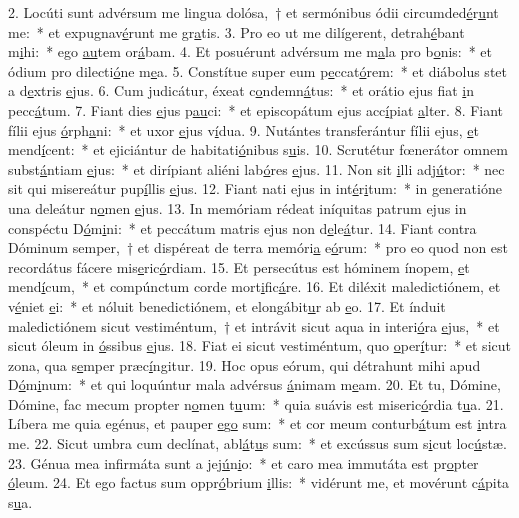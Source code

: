2. Locúti sunt advérsum me lingua dolósa,~† et sermónibus ódii circumded\uline{é}r\uline{u}nt me:~* et expugnav\uline{é}runt me gr\uline{a}tis.
3. Pro eo ut me dilígerent, detrah\uline{é}bant m\uline{i}hi:~* ego \uline{au}tem or\uline{á}bam.
4. Et posuérunt advérsum me m\uline{a}la pro b\uline{o}nis:~* et ódium pro dilecti\uline{ó}ne m\uline{e}a.
5. Constítue super eum p\uline{e}ccat\uline{ó}rem:~* et diábolus stet a d\uline{e}xtris \uline{e}jus.
6. Cum judicátur, éxeat c\uline{o}ndemn\uline{á}tus:~* et orátio ejus fiat \uline{i}n pecc\uline{á}tum.
7. Fiant dies \uline{e}jus p\uline{au}ci:~* et episcopátum ejus acc\uline{í}piat \uline{a}lter.
8. Fiant fílii ejus \uline{ó}rph\uline{a}ni:~* et uxor \uline{e}jus v\uline{í}dua.
9. Nutántes transferántur fílii ejus, \uline{e}t mend\uline{í}cent:~* et ejiciántur de habitati\uline{ó}nibus s\uline{u}is.
10. Scrutétur fœnerátor omnem subst\uline{á}ntiam \uline{e}jus:~* et dirípiant aliéni lab\uline{ó}res \uline{e}jus.
11. Non sit \uline{i}lli adj\uline{ú}tor:~* nec sit qui misereátur pup\uline{í}llis \uline{e}jus.
12. Fiant nati ejus in int\uline{é}r\uline{i}tum:~* in generatióne una deleátur n\uline{o}men \uline{e}jus.
13. In memóriam rédeat iníquitas patrum ejus in conspéctu D\uline{ó}m\uline{i}ni:~* et peccátum matris ejus non d\uline{e}le\uline{á}tur.
14. Fiant contra Dóminum semper,~† et dispéreat de terra memóri\uline{a} e\uline{ó}rum:~* pro eo quod non est recordátus fácere mis\uline{e}ric\uline{ó}rdiam.
15. Et persecútus est hóminem ínopem, \uline{e}t mend\uline{í}cum,~* et compúnctum corde mort\uline{i}fic\uline{á}re.
16. Et diléxit maledictiónem, et v\uline{é}niet \uline{e}i:~* et nóluit benedictiónem, et elongábit\uline{u}r ab \uline{e}o.
17. Et índuit maledictiónem sicut vestiméntum,~† et intrávit sicut aqua in interi\uline{ó}ra \uline{e}jus,~* et sicut óleum in \uline{ó}ssibus \uline{e}jus.
18. Fiat ei sicut vestiméntum, quo \uline{o}per\uline{í}tur:~* et sicut zona, qua s\uline{e}mper præc\uline{í}ngitur.
19. Hoc opus eórum, qui détrahunt mihi apud D\uline{ó}m\uline{i}num:~* et qui loquúntur mala advérsus \uline{á}nimam m\uline{e}am.
20. Et tu, Dómine, Dómine, fac mecum propter n\uline{o}men t\uline{u}um:~* quia suávis est miseric\uline{ó}rdia t\uline{u}a.
21. Líbera me quia egénus, et pauper \uline{e}g\uline{o} sum:~* et cor meum conturb\uline{á}tum est \uline{i}ntra me.
22. Sicut umbra cum declínat, abl\uline{á}t\uline{u}s sum:~* et excússus sum s\uline{i}cut loc\uline{ú}stæ.
23. Génua mea infirmáta sunt a jej\uline{ú}n\uline{i}o:~* et caro mea immutáta est pr\uline{o}pter \uline{ó}leum.
24. Et ego factus sum oppr\uline{ó}brium \uline{i}llis:~* vidérunt me, et movérunt c\uline{á}pita s\uline{u}a.
